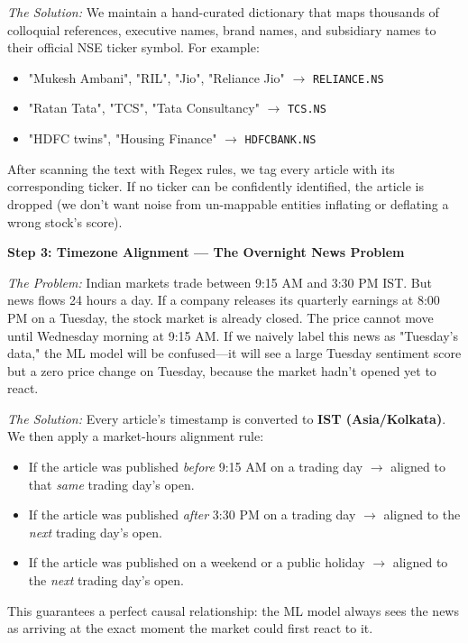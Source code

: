 \documentclass[11pt, a4paper]{article}
\begin{document}
\textit{The Solution:} We maintain a hand-curated dictionary that maps thousands of colloquial references, executive names, brand names, and subsidiary names to their official NSE ticker symbol. For example:
\begin{itemize}[noitemsep]
    \item "Mukesh Ambani", "RIL", "Jio", "Reliance Jio" $\rightarrow$ \texttt{RELIANCE.NS}
    \item "Ratan Tata", "TCS", "Tata Consultancy" $\rightarrow$ \texttt{TCS.NS}
    \item "HDFC twins", "Housing Finance" $\rightarrow$ \texttt{HDFCBANK.NS}
\end{itemize}
After scanning the text with Regex rules, we tag every article with its corresponding ticker. If no ticker can be confidently identified, the article is dropped (we don't want noise from un-mappable entities inflating or deflating a wrong stock's score).

\vspace{0.5em}
\textbf{Step 3: Timezone Alignment — The Overnight News Problem}

\textit{The Problem:} Indian markets trade between 9:15 AM and 3:30 PM IST. But news flows 24 hours a day. If a company releases its quarterly earnings at 8:00 PM on a Tuesday, the stock market is already closed. The price cannot move until Wednesday morning at 9:15 AM. If we naively label this news as "Tuesday's data," the ML model will be confused—it will see a large Tuesday sentiment score but a zero price change on Tuesday, because the market hadn't opened yet to react.

\textit{The Solution:} Every article's timestamp is converted to \textbf{IST (Asia/Kolkata)}. We then apply a market-hours alignment rule:
\begin{itemize}[noitemsep]
    \item If the article was published \textit{before} 9:15 AM on a trading day $\rightarrow$ aligned to that \textit{same} trading day's open.
    \item If the article was published \textit{after} 3:30 PM on a trading day $\rightarrow$ aligned to the \textit{next} trading day's open.
    \item If the article was published on a weekend or a public holiday $\rightarrow$ aligned to the \textit{next} trading day's open.
\end{itemize}
This guarantees a perfect causal relationship: the ML model always sees the news as arriving at the exact moment the market could first react to it.
\end{document}
